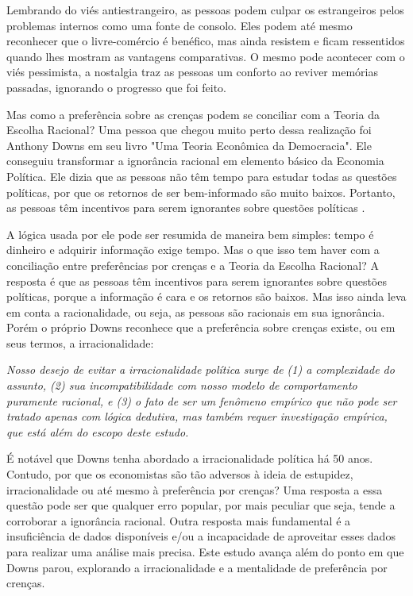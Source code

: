Lembrando do viés antiestrangeiro, as pessoas podem culpar os estrangeiros pelos problemas internos como uma fonte de consolo. Eles podem até mesmo reconhecer que o livre-comércio é benéfico, mas ainda resistem e ficam ressentidos quando lhes mostram as vantagens comparativas. O mesmo pode acontecer com o viés pessimista, a nostalgia traz as pessoas um conforto ao reviver memórias passadas, ignorando o progresso que foi feito.

Mas como a preferência sobre as crenças podem se conciliar com a Teoria da Escolha Racional? Uma pessoa que chegou muito perto dessa realização foi Anthony Downs em seu livro "Uma Teoria Econômica da Democracia". Ele conseguiu transformar a ignorância racional em elemento básico da Economia Política. Ele dizia que as pessoas não têm tempo para estudar todas as questões políticas, por que os retornos de ser bem-informado são muito baixos. Portanto, as pessoas têm incentivos para serem ignorantes sobre questões políticas \cite{downs1957economic}.

A lógica usada por ele pode ser resumida de maneira bem simples: tempo é dinheiro e adquirir informação exige tempo. Mas o que isso tem haver com a conciliação entre preferências por crenças e a Teoria da Escolha Racional? A resposta é que as pessoas têm incentivos para serem ignorantes sobre questões políticas, porque a informação é cara e os retornos são baixos. Mas isso ainda leva em conta a racionalidade, ou seja, as pessoas são racionais em sua ignorância. Porém o próprio Downs reconhece que a preferência sobre crenças existe, ou em seus termos, a irracionalidade:

\begin{citacao}
    \textit{
        Nosso desejo de evitar a irracionalidade política surge de (1) a complexidade do assunto, (2) sua incompatibilidade com nosso modelo de comportamento puramente racional, e (3) o fato de ser um fenômeno empírico que não pode ser tratado apenas com lógica dedutiva, mas também requer investigação empírica, que está além do escopo deste estudo.
    } \newline
    \cite{downs1957economic}
\end{citacao}

É notável que Downs tenha abordado a irracionalidade política há 50 anos. Contudo, por que os economistas são tão adversos à ideia de estupidez, irracionalidade ou até mesmo à preferência por crenças? Uma resposta a essa questão pode ser que qualquer erro popular, por mais peculiar que seja, tende a corroborar a ignorância racional. Outra resposta mais fundamental é a insuficiência de dados disponíveis e/ou a incapacidade de aproveitar esses dados para realizar uma análise mais precisa. Este estudo avança além do ponto em que Downs parou, explorando a irracionalidade e a mentalidade de preferência por crenças.

